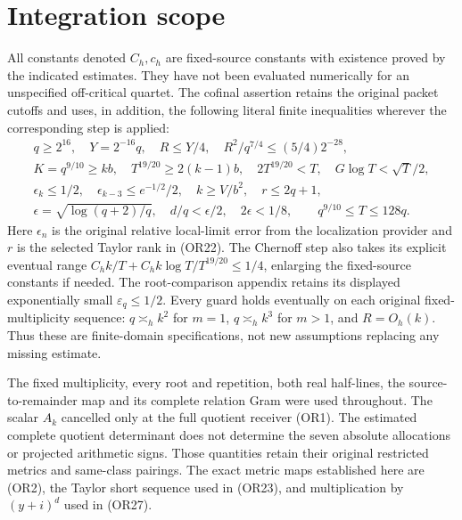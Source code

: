 \documentclass[11pt,a4paper]{article}
\begin{document}
\section{Integration scope}
All constants denoted \(C_h,c_h\) are fixed-source constants with
existence proved by the indicated estimates.  They have not been
evaluated numerically for an unspecified off-critical quartet.
The cofinal assertion retains the original packet cutoffs and uses,
in addition, the following literal finite inequalities wherever the
corresponding step is applied:
\[
 \begin{gathered}
 q\geq2^{16},\quad Y=2^{-16}q,\quad R\leq Y/4,\quad
 R^2/q^{7/4}\leq(5/4)2^{-28},\\
 K=q^{9/10}\geq kb,\quad
 T^{19/20}\geq2(k-1)b,\quad
 2T^{19/20}<T,\quad G\log T<\sqrt T/2,\\
 \epsilon_k\leq1/2,\quad
 \epsilon_{k-3}\leq e^{-1/2}/2,\quad k\geq V/b^2,\quad
 r\leq2q+1,\\
 \epsilon=\sqrt{\log(q+2)/q},\quad
 d/q<\epsilon/2,\quad 2\epsilon<1/8 ,
 \qquad q^{9/10}\leq T\leq128q .
 \end{gathered}                                      \tag{OR41}
\]
Here \(\epsilon_n\) is the original relative local-limit error
from the localization provider and \(r\) is the selected Taylor
rank in (OR22).  The Chernoff step also takes its explicit eventual
range \(C_hk/T+C_hk\log T/T^{19/20}\leq1/4\), enlarging the
fixed-source constants if needed.  The root-comparison appendix
retains its displayed exponentially small \(\varepsilon_q\leq1/2\).
Every guard holds eventually on each original fixed-multiplicity
sequence: \(q\asymp_h k^2\) for \(m=1\), \(q\asymp_h k^3\) for
\(m>1\), and \(R=O_h(k)\).  Thus these are finite-domain
specifications, not new assumptions replacing any missing estimate.

The fixed multiplicity, every root and repetition, both real
half-lines, the source-to-remainder map and its complete relation
Gram were used throughout.  The scalar \(A_k\) cancelled only at
the full quotient receiver (OR1).  The estimated complete
quotient determinant does not determine the seven absolute
allocations or projected arithmetic signs.  Those quantities
retain their original restricted metrics and same-class pairings.
The exact metric maps established here are (OR2), the Taylor
short sequence used in (OR23), and multiplication by \((y+i)^d\)
used in (OR27).



\endgroup
\end{document}
